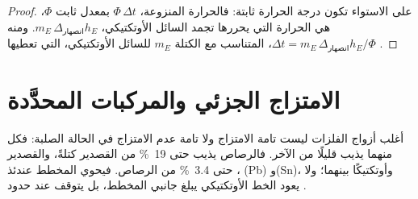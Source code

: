 \begin{proof}
على الاستواء تكون درجة الحرارة ثابتة: فالحرارة المنزوعة، $\Phi\,\Delta t$
بمعدل ثابت $\Phi$، هي الحرارة التي يحررها تجمد السائل
الأوتكتيكي، $m_E\,\Delta_{\text{انصهار}}h_E$. ومنه $\Delta t = m_E\,\Delta_{\text{انصهار}}h_E/
\Phi$، المتناسب مع الكتلة $m_E$ للسائل الأوتكتيكي، التي تعطيها .
\end{proof}

\section{الامتزاج الجزئي والمركبات المحدَّدة}

أغلب أزواج الفلزات ليست تامة الامتزاج ولا تامة عدم الامتزاج في الحالة
الصلبة: فكل منهما يذيب قليلًا من الآخر. فالرصاص يذيب حتى 19~\% من القصدير
كتلةً، والقصدير حتى 3.4~\% من الرصاص. فيحوي المخطط عندئذ ، (Pb) و(Sn)، وأوتكتيكًا بينهما؛ ولا يعود الخط الأوتكتيكي
يبلغ جانبي المخطط، بل يتوقف عند حدود .

